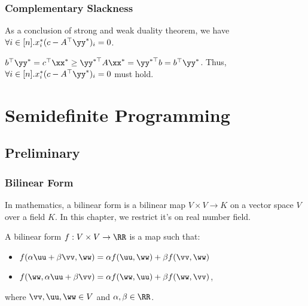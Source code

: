 \documentclass[12pt]{article}
\begin{document}
\subsubsection{Complementary Slackness}

\begin{Theorem}
  As a conclusion of strong and weak duality
  theorem, we have
  $\forall i \in [n]. x_i^*(c - A^\top \yy^*)_i
  = 0$.
\end{Theorem}

\begin{Proof}
  $b^\top \yy^* = c^\top \xx^*
  \geq \yy^{*\top} A \xx^*
  = \yy^{*\top} b = b^\top \yy^*$. Thus,
  $\forall i \in [n]. x_i^*(c - A^\top \yy^*)_i
  = 0$ must hold.
\end{Proof}

\section{Semidefinite Programming}

\subsection{Preliminary}

\subsubsection{Bilinear Form}

In mathematics, a bilinear form is a bilinear
map $V \times V \rightarrow K$ on a vector
space $V$ over a field $K$. In this chapter,
we restrict it's on real number field.

\begin{Define}
  A bilinear form $f: V \times V \rightarrow
  \RR$ is a map such that:
  \begin{itemize}
  \item $f(\alpha \uu + \beta \vv, \ww) =
    \alpha f(\uu, \ww) + \beta f(\vv, \ww)$
  \item $f(\ww, \alpha \uu + \beta \vv) =
    \alpha f(\ww, \uu) + \beta f(\ww, \vv)$,
  \end{itemize}
  where $\vv, \uu, \ww \in V$ and
  $\alpha, \beta \in \RR$.
\end{Define}
\end{document}
